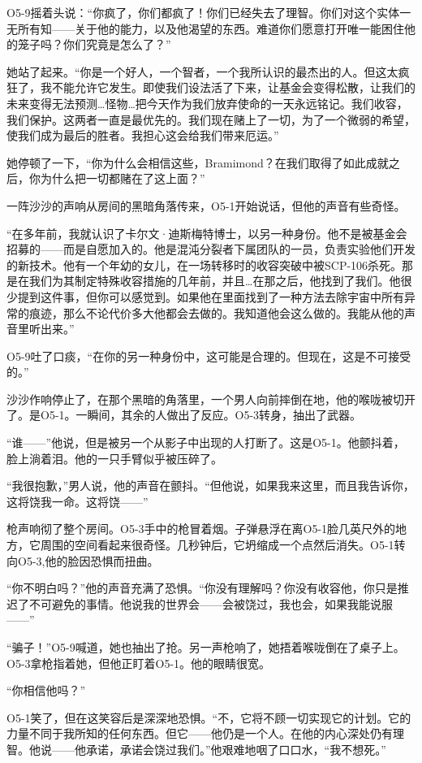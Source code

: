 O5-9摇着头说：“你疯了，你们都疯了！你们已经失去了理智。你们对这个实体一无所有知——关于他的能力，以及他渴望的东西。难道你们愿意打开唯一能困住他的笼子吗？你们究竟是怎么了？”

她站了起来。“你是一个好人，一个智者，一个我所认识的最杰出的人。但这太疯狂了，我不能允许它发生。即使我们设法活了下来，让基金会变得松散，让我们的未来变得无法预测…怪物…把今天作为我们放弃使命的一天永远铭记。我们收容，我们保护。这两者一直是最优先的。我们现在赌上了一切，为了一个微弱的希望，使我们成为最后的胜者。我担心这会给我们带来厄运。”

她停顿了一下，“你为什么会相信这些，Bramimond？在我们取得了如此成就之后，你为什么把一切都赌在了这上面？”

一阵沙沙的声响从房间的黑暗角落传来，O5-1开始说话，但他的声音有些奇怪。

“在多年前，我就认识了卡尔文·迪斯梅特博士，以另一种身份。他不是被基金会招募的——而是自愿加入的。他是混沌分裂者下属团队的一员，负责实验他们开发的新技术。他有一个年幼的女儿，在一场转移时的收容突破中被SCP-106杀死。那是在我们为其制定特殊收容措施的几年前，并且…在那之后，他找到了我们。他很少提到这件事，但你可以感觉到。如果他在里面找到了一种方法去除宇宙中所有异常的痕迹，那么不论代价多大他都会去做的。我知道他会这么做的。我能从他的声音里听出来。”

O5-9吐了口痰，“在你的另一种身份中，这可能是合理的。但现在，这是不可接受的。”

沙沙作响停止了，在那个黑暗的角落里，一个男人向前摔倒在地，他的喉咙被切开了。是O5-1。一瞬间，其余的人做出了反应。O5-3转身，抽出了武器。

“谁——”他说，但是被另一个从影子中出现的人打断了。这是O5-1。他颤抖着，脸上淌着泪。他的一只手臂似乎被压碎了。

“我很抱歉，”男人说，他的声音在颤抖。“但他说，如果我来这里，而且我告诉你，这将饶我一命。这将饶——”

枪声响彻了整个房间。O5-3手中的枪冒着烟。子弹悬浮在离O5-1脸几英尺外的地方，它周围的空间看起来很奇怪。几秒钟后，它坍缩成一个点然后消失。O5-1转向O5-3,他的脸因恐惧而扭曲。

“你不明白吗？”他的声音充满了恐惧。“你没有理解吗？你没有收容他，你只是推迟了不可避免的事情。他说我的世界会——会被饶过，我也会，如果我能说服——”

“骗子！”O5-9喊道，她也抽出了抢。另一声枪响了，她捂着喉咙倒在了桌子上。O5-3拿枪指着她，但他正盯着O5-1。他的眼睛很宽。

“你相信他吗？”

O5-1笑了，但在这笑容后是深深地恐惧。“不，它将不顾一切实现它的计划。它的力量不同于我所知的任何东西。但它——他仍是一个人。在他的内心深处仍有理智。他说——他承诺，承诺会饶过我们。”他艰难地咽了口口水，“我不想死。”

